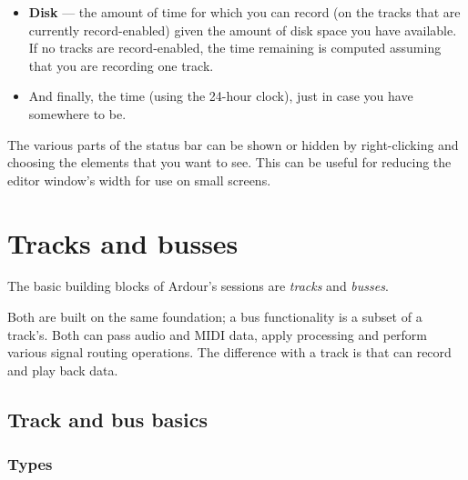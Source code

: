 \documentclass[10pt,a4paper]{book}
\begin{document}
{\begin{itemize}
\begin{ddanger}
Note that DSP load will probably not vary predictably with CPU speed.
Many other things are involved in the timing of the sound-card / JACK
/ Ardour interaction; including the real-time performance of your
system and kernel, the details of your hardware, and in some cases
blind (good or bad) luck.
\end{ddanger}

\item \textbf{Disk} --- the amount of time for which you can record (on the
  tracks that are currently record-enabled) given the amount of disk
  space you have available.  If no tracks are record-enabled, the time
  remaining is computed assuming that you are recording one track.
\item And finally, the time (using the 24-hour clock), just in case
  you have somewhere to be.
\end{itemize}

The various parts of the status bar can be shown or hidden by
right-clicking and choosing the elements that you want to see.  This
can be useful for reducing the editor window's width for use on small
screens.







\chapter{Tracks and busses}
\label{ch:tracks-and-busses}

The basic building blocks of Ardour's sessions are \emph{tracks}
and \emph{busses}.

Both are built on the same foundation; a bus functionality is a
subset of a track's.  Both can pass audio and MIDI data, apply
processing and perform various signal routing operations.  The
difference with a track is that can record and play back data.

\section{Track and bus basics}

\subsection{Types}

}
\end{document}
